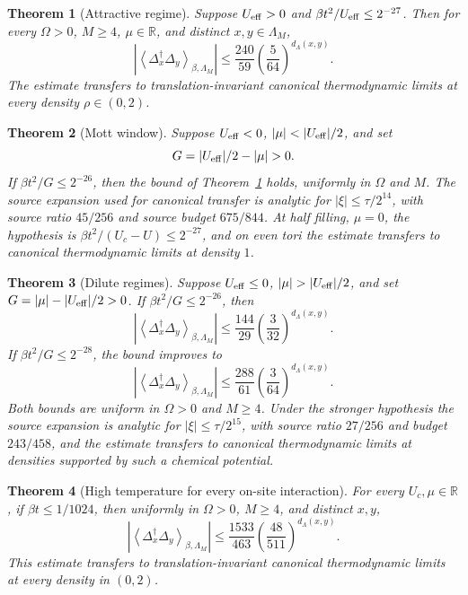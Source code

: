 \documentclass[11pt]{article}
\newtheorem{theorem}{Theorem}
\newcommand{\Deltaop}{\Delta}
\begin{document}
\begin{theorem}[Attractive regime]\label{thm:attractive}
Suppose $U_{\rm eff}>0$ and $\beta t^2/U_{\rm eff}\le2^{-27}$. Then for every $\Omega>0$, $M\ge4$, $\mu\in\mathbb R$, and distinct $x,y\in\Lambda_M$,
\[
 \left|\left\langle\Deltaop_x^\dagger\Deltaop_y\right\rangle_{\beta,\Lambda_M}\right|
 \le \frac{240}{59}\left(\frac5{64}\right)^{d_\Lambda(x,y)}.
\]
The estimate transfers to translation-invariant canonical thermodynamic limits at every density $\rho\in(0,2)$.
\end{theorem}

\begin{theorem}[Mott window]\label{thm:mott}
Suppose $U_{\rm eff}<0$, $|\mu|<|U_{\rm eff}|/2$, and set
\[
 G=|U_{\rm eff}|/2-|\mu|>0.
\]
If $\beta t^2/G\le2^{-26}$, then the bound of Theorem~\ref{thm:attractive} holds, uniformly in $\Omega$ and $M$. The source expansion used for canonical transfer is analytic for $|\xi|\le\tau/2^{14}$, with source ratio $45/256$ and source budget $675/844$. At half filling, $\mu=0$, the hypothesis is $\beta t^2/(U_c-U)\le2^{-27}$, and on even tori the estimate transfers to canonical thermodynamic limits at density $1$.
\end{theorem}

\begin{theorem}[Dilute regimes]\label{thm:dilute}
Suppose $U_{\rm eff}\le0$, $|\mu|>|U_{\rm eff}|/2$, and set $G=|\mu|-|U_{\rm eff}|/2>0$. If $\beta t^2/G\le2^{-26}$, then
\[
 \left|\left\langle\Deltaop_x^\dagger\Deltaop_y\right\rangle_{\beta,\Lambda_M}\right|
 \le \frac{144}{29}\left(\frac3{32}\right)^{d_\Lambda(x,y)}.
\]
If $\beta t^2/G\le2^{-28}$, the bound improves to
\[
 \left|\left\langle\Deltaop_x^\dagger\Deltaop_y\right\rangle_{\beta,\Lambda_M}\right|
 \le \frac{288}{61}\left(\frac3{64}\right)^{d_\Lambda(x,y)}.
\]
Both bounds are uniform in $\Omega>0$ and $M\ge4$. Under the stronger hypothesis the source expansion is analytic for $|\xi|\le\tau/2^{15}$, with source ratio $27/256$ and budget $243/458$, and the estimate transfers to canonical thermodynamic limits at densities supported by such a chemical potential.
\end{theorem}

\begin{theorem}[High temperature for every on-site interaction]\label{thm:hightemp}
For every $U_c,\mu\in\mathbb R$, if $\beta t\le1/1024$, then uniformly in $\Omega>0$, $M\ge4$, and distinct $x,y$,
\[
 \left|\left\langle\Deltaop_x^\dagger\Deltaop_y\right\rangle_{\beta,\Lambda_M}\right|
 \le \frac{1533}{463}\left(\frac{48}{511}\right)^{d_\Lambda(x,y)}.
\]
This estimate transfers to translation-invariant canonical thermodynamic limits at every density in $(0,2)$.
\end{theorem}
\end{document}
